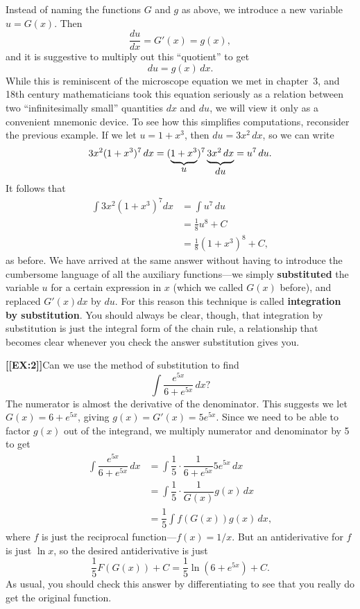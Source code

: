 Instead of naming the functions $G$ and $g$ as above, we introduce a
new variable $u=G(x)$.  Then
\[
\dfrac{du}{dx} = G'(x)=g(x),
\]
and it is suggestive to multiply out this ``quotient'' to get
\[
du=g(x)\,dx.
\]  
While this is reminiscent of the microscope equation we met in
chapter~3, and 18th century mathematicians took this equation
seriously as a relation between two ``infinitesimally small''
quantities $dx$ and $du$, we will view it only as a convenient
mnemonic device. To see how this simplifies computations, reconsider
the previous example.  If we let $u=1+x^3$, then $du=3x^2\,dx$, so we
can write
	\[
3x^2 (1 + x^3)^7 \, dx = 
		(\underbrace{1 + \rule[-3pt]{0pt}{6pt}x^3}_
			{\displaystyle u})^7 
		\underbrace{3x^2 \rule[-3pt]{0pt}{6pt}\, dx}_
			{\displaystyle du} =
		u^7 \, du.
\]
It follows that
\begin{align*}
\int 3x^2 \left(1 + x^3 \right)^7 dx &= \int u^7 \, du \\
  &= \tfrac{1}{8} u^8 + C \\
  &= \tfrac{1}{8} \left(1 + x^3\right)^8 + C,
\end{align*}
as before.  We have arrived at the same answer without having to
introduce the cumbersome language of all the auxiliary functions---we
simply {\bf substituted} the variable $u$ for a certain expression in
$x$ (which we called $G(x)$ before), and replaced $G'(x)dx$ by
$du$. For this reason this technique is called {\bf integration by
  substitution}.  You should always be clear, though, that integration
by substitution is just the integral form of the chain rule, a
relationship that becomes clear whenever you check the answer
substitution gives you.






{\bf [[EX:2]]}\quad  Can we use the method of substitution to find
	\[
\int \dfrac{e^{5x}}{6 + e^{5x}} \, dx?
\]
The numerator is almost the derivative of the denominator.  This
suggests we let $G(x) = 6+e^{5x}$, giving $g(x)=G'(x)= 5e^{5x}$.
Since we need to be able to factor $g(x)$ out of the integrand, we
multiply numerator and denominator by 5 to get
\begin{align*}
\int \dfrac{e^{5x}}{6 + e^{5x}} \, dx 
  &= \int \dfrac{1}{5} \cdot \dfrac{1}{6+e^{5x}}5e^{5x}\,dx \\
  &= \int \dfrac{1}{5} \cdot \dfrac{1}{G(x)}g(x)\,dx \\
  &= \dfrac{1}{5}\int f(G(x))g(x)\, dx,
\end{align*}
where $f$ is just the reciprocal function---$f(x)=1/x$.  But an
antiderivative for $f$ is just $\ln{x}$, so the desired antiderivative
is just
\[
\dfrac{1}{5}F(G(x))+C= \dfrac{1}{5}\ln(6+e^{5x})+C.
\]
As usual, you should check this answer by differentiating to see that
you really do get the original function.

